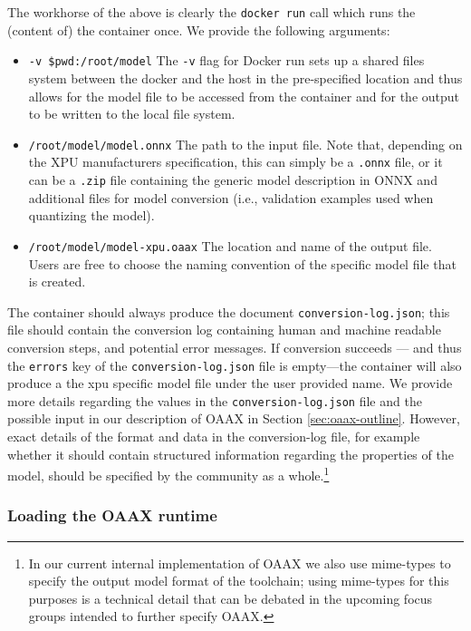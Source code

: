 \documentclass{article}
\begin{document}
The workhorse of the above is clearly the \texttt{docker run} call which runs the (content of) the container once. We provide the following arguments:
\begin{itemize}
\item \texttt{-v \$pwd:/root/model} The \texttt{-v} flag for Docker run sets up a shared files system between the docker and the host in the pre-specified location and thus allows for the model file to be accessed from the container and for the output to be written to the local file system.
\item \texttt{/root/model/model.onnx} The path to the input file. Note that, depending on the XPU manufacturers specification, this can simply be a \texttt{.onnx} file, or it can be a \texttt{.zip} file containing the generic model description in ONNX and additional files for model conversion (i.e., validation examples used when quantizing the model).
\item \texttt{/root/model/model-xpu.oaax} The location and name of the output file. Users are free to choose the naming convention of the specific model file that is created.
\end{itemize}

The container should always produce the document \texttt{conversion-log.json}; this file should contain the conversion log containing human and machine readable conversion steps, and potential error messages. If conversion succeeds --- and thus the \texttt{errors} key of the \texttt{conversion-log.json} file is empty---the container will also produce a the xpu specific model file under the user provided name. We provide more details regarding the values in the \texttt{conversion-log.json} file and the possible input in our description of OAAX in Section \ref{sec:oaax-outline}. However, exact details of the format and data in the conversion-log file, for example whether it should contain structured information regarding the properties of the model, should be specified by the community as a whole.\footnote{In our current internal implementation of OAAX we also use mime-types to specify the output model format of the toolchain; using mime-types for this purposes is a technical detail that can be debated in the upcoming focus groups intended to further specify OAAX.}

\subsubsection{Loading the OAAX runtime}
\end{document}
